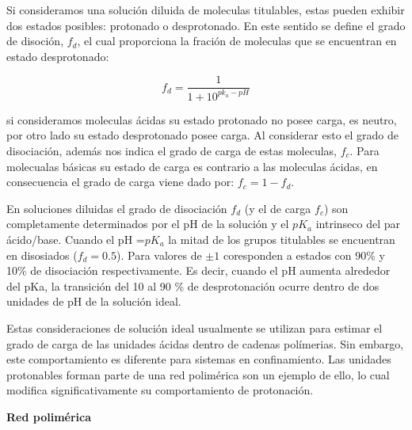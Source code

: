 Si consideramos una soluci\'on diluida de moleculas titulables, estas pueden exhibir dos estados posibles: protonado o desprotonado. En este sentido se define el grado de disoción, $f_d$, el cual  proporciona la fraci\'on de moleculas que se encuentran en estado desprotonado:


\begin{equation}
    f_d = \frac{1}{1+10^{pk_a -pH}}
    \label{eq:diso}
\end{equation}

si consideramos moleculas \'acidas su estado protonado no posee carga, es  neutro, por otro lado su estado desprotonado posee carga. 
Al considerar esto el grado de disociaci\'on, adem\'as nos indica el grado de carga de estas moleculas, $f_c$.
Para molecualas b\'asicas su estado de carga es contrario a las moleculas \'acidas, en consecuencia el grado de carga viene dado por: $f_c =1- f_d$.

En soluciones diluidas el grado de disociaci\'on $f_d$ (y el de carga $f_c$) son completamente determinados por el pH de la soluci\'on y el $pK_a$ intrinseco del par \'acido/base. 
Cuando el pH =$pK_a$ la mitad de los grupos titulables se encuentran en disosiados ($f_d = 0.5$). Para valores de $\pm 1$ coresponden a estados con 90\% y 10\% de disociaci\'on respectivamente.
Es decir, cuando el pH aumenta alrededor del pKa, la transici\'on del 10 al 90 \% de desprotonaci\'on ocurre dentro de dos unidades de pH de la soluci\'on ideal. 

Estas consideraciones de soluci\'on ideal usualmente se utilizan para estimar el grado de carga de las unidades \'acidas dentro de cadenas pol\'imerias. Sin embargo, este comportamiento es diferente para sistemas  en confinamiento. Las unidades  protonables forman parte de una red polim\'erica son un ejemplo de ello, lo cual modifica significativamente su comportamiento de protonaci\'on.


\textbf{Red polim\'erica} \\


